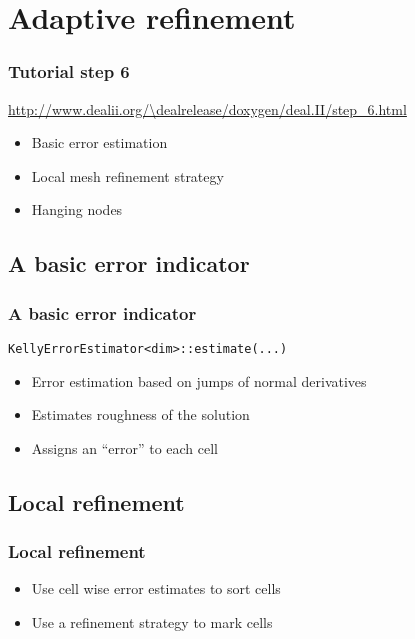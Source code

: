 
\section[Adaptivity]{Adaptive refinement}

\begin{frame}
  \frametitle{Tutorial step 6}
  {\footnotesize{\url{http://www.dealii.org/\dealrelease/doxygen/deal.II/step_6.html}}}
  \begin{itemize}
  \item Basic error estimation
  \item Local mesh refinement strategy
  \item Hanging nodes
  \end{itemize}
\end{frame}

\subsection{A basic error indicator}
\begin{frame}
  \frametitle{A basic error indicator}
  \begin{block}{\lstinline!KellyErrorEstimator<dim>::estimate(...)!}
    \begin{itemize}
    \item Error estimation based on jumps of normal derivatives
    \item Estimates roughness of the solution
    \item Assigns an ``error'' to each cell
    \end{itemize}
  \end{block}
\end{frame}

\subsection{Local refinement}
\begin{frame}
  \frametitle{Local refinement}
  \begin{itemize}
  \item Use cell wise error estimates to sort cells
  \item Use a refinement strategy to mark cells
  \end{itemize}
  \begin{block}{}
    
  \end{block}
\end{frame}

